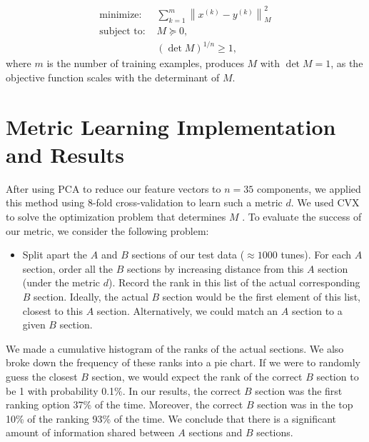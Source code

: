 \documentclass{article} %
\newcommand{\vectornorm}[1]{\left\| #1 \right\|}
\begin{document}
\begin{align*} 
\text{minimize: } & \sum_{k=1}^m \vectornorm{x^{(k)} - y^{(k)}}_M^2 \\
\text{subject to: }
& M \succeq 0, \\
& (\det M)^{1/n} \ge 1,
\end{align*} 
where $m$ is the number of training examples, produces $M$ with $\det M = 1$, as
the objective function scales with the determinant of $M$.

\section{Metric Learning Implementation and Results}

After using PCA to reduce our feature vectors to $n = 35$ components, we applied
this method using 8-fold cross-validation to learn such a metric $d$. We used
CVX to solve the optimization problem that determines $M$ \cite{cvx}.
To evaluate the success of our metric, we consider the following problem:
\begin{itemize}
\item[] Split apart the $A$ and $B$ sections of our test data ($\approx 1000$
tunes). For each $A$ section, order all the $B$ sections by increasing distance
from this $A$ section (under the metric $d$). Record the rank in this list of
the actual corresponding $B$ section. Ideally, the actual $B$ section would be
the first element of this list, closest to this $A$ section. Alternatively, we
could match an $A$ section to a given $B$ section.
\end{itemize}
We made a cumulative histogram of the ranks of the actual sections.%
We also broke down the frequency of these ranks into a pie chart. %
If we were to randomly guess the closest $B$ section, we would expect the rank
of the correct $B$ section to be 1 with probability 0.1\%. In our results, the
correct $B$ section was the first ranking option 37\% of the time. Moreover, the
correct $B$ section was in the top 10\% of the ranking 93\% of the time. We
conclude that there is a significant amount of information shared between $A$
sections and $B$ sections.
\end{document}
